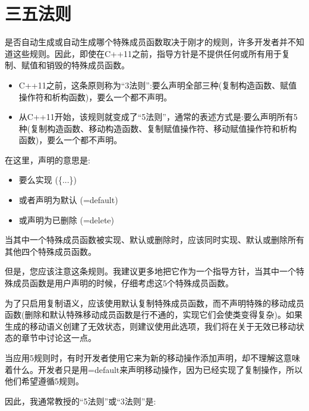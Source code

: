 \section{三五法则}
是否自动生成或自动生成哪个特殊成员函数取决于刚才的规则，许多开发者并不知道这些规则。因此，即使在C++11之前，指导方针是不提供任何或所有用于复制、赋值和销毁的特殊成员函数。

\begin{itemize}
	\item C++11之前，这条原则称为“3法则”:要么声明全部三种(复制构造函数、赋值操作符和析构函数)，要么一个都不声明。
	\item 从C++11开始，该规则就变成了“5法则”，通常的表述方式是:要么声明所有5种(复制构造函数、移动构造函数、复制赋值操作符、移动赋值操作符和析构函数)，要么一个都不声明。
\end{itemize}

在这里，声明的意思是:

\begin{itemize}
	\item 要么实现 (\{...\})
	\item 或者声明为默认 (=default)
	\item 或声明为已删除 (=delete)
\end{itemize}

当其中一个特殊成员函数被实现、默认或删除时，应该同时实现、默认或删除所有其他四个特殊成员函数。

但是，您应该注意这条规则。我建议更多地把它作为一个指导方针，当其中一个特殊成员函数是用户声明的时候，仔细考虑这5个特殊成员函数。

为了只启用复制语义，应该使用默认复制特殊成员函数，而不声明特殊的移动成员函数(删除和默认特殊移动成员函数是行不通的，实现它们会使类变得复杂)。如果生成的移动语义创建了无效状态，则建议使用此选项，我们将在关于无效已移动状态的章节中讨论这一点。

当应用5规则时，有时开发者使用它来为新的移动操作添加声明，却不理解这意味着什么。开发者只是用=default来声明移动操作，因为已经实现了复制操作，所以他们希望遵循5规则。

因此，我通常教授的“5法则”或“3法则”是:

